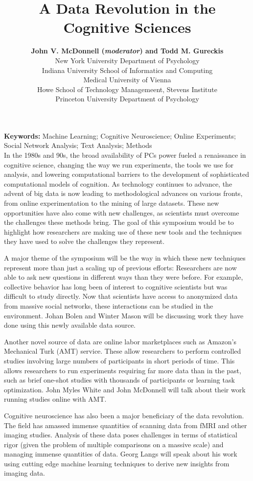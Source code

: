 \documentclass[10pt,letterpaper]{article}
\title{A Data Revolution in the Cognitive Sciences}
\author{{\large \bf John V. McDonnell (\emph{moderator}) and Todd M. Gureckis}  \\
  New York University Department of Psychology
  \AND {\large \bf Johan Bolen} \\
  Indiana University School of Informatics and Computing
  \AND {\large \bf Georg Langs} \\
  Medical University of Vienna
  \AND {\large \bf Winter Mason, Meeyoung Cha, Krishna Gummadi, Farshad Kooti, and Haeryun Yang} \\
  Howe School of Technology Managemeent, Stevens Institute 
  \AND {\large \bf John Myles White} \\
  Princeton University Department of Psychology }
\begin{document}
\maketitle


\textbf{Keywords:} 
Machine Learning; Cognitive Neuroscience; Online Experiments; Social Network
Analysis; Text Analysis; Methods\\

In the 1980s and 90s, the broad availability of PCs power fueled a renaissance in
cognitive science, changing the way we run experiments, the tools we use for
analysis, and lowering computational barriers to the development of sophisticated
computational models of cognition. As technology continues to advance, the advent
of big data is now leading to methodological advances on various fronts, from
online experimentation to the mining of large datasets. These new opportunities
have also come with new challenges, as scientists must overcome the challenges
these methods bring. The goal of this symposium would be to highlight how
researchers are making use of these new tools and the techniques they have used
to solve the challenges they represent. 

A major theme of the symposium will be the way in which these new techniques
represent more than just a scaling up of previous efforts: Researchers are now
able to ask new questions in different ways than they were before. For example,
collective behavior has long been of interest to cognitive scientists but was
difficult to study directly. Now that scientists have access to anonymized data
from massive social networks, these interactions can be studied in the
environment. Johan Bolen and Winter Mason will be discussing work they have done
using this newly available data source.

Another novel source of data are online labor marketplaces such as Amazon's
Mechanical Turk (AMT) service. These allow researchers to perform controlled
studies involving large numbers of participants in short periods of time. This
allows researchers to run experiments requiring far more data than in the past,
such as brief one-shot studies with thousands of participants or learning task
optimization. John Myles White and John McDonnell will talk about their work
running studies online with AMT.

Cognitive neuroscience has also been a major beneficiary of the data revolution.
The field has amassed immense quantities of scanning data from fMRI and other
imaging studies.  Analysis of these data poses challenges in terms of statistical
rigor (given the problem of multiple comparisons on a massive scale) and managing
immense quantities of data. Georg Langs will speak about his work using cutting
edge machine learning techniques to derive new insights from imaging data.
\end{document}
